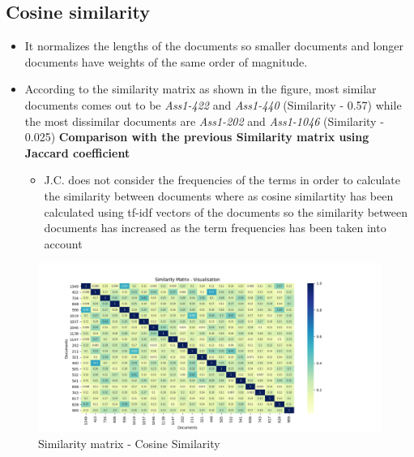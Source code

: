 \documentclass[7pt,a4paper]{article}
\begin{document}
\subsection{Cosine similarity}
\begin{itemize}
\item{It normalizes the lengths of the documents so smaller documents and longer documents have weights of the same order of magnitude.}
\item{According to the similarity matrix as shown in the figure, most similar documents comes out to be \textit{Ass1-422} and \textit{Ass1-440} (Similarity - 0.57) while the most dissimilar documents are \textit{Ass1-202} and \textit{Ass1-1046} (Similarity - 0.025)}
\textbf{Comparison with the previous Similarity matrix using Jaccard coefficient}
\begin{itemize}
\item{J.C. does not consider the frequencies of the terms in order to calculate the similarity between documents where as cosine similartity has been calculated using tf-idf vectors of the documents so the similarity between documents has increased as the term frequencies has been taken into account}
\end{itemize}
\end{itemize}
\begin{figure}[h]
\centering
\includegraphics[scale=.40]{sim}
\caption{Similarity matrix - Cosine Similarity}
\label{image-Cos}
\end{figure}
\end{document}
